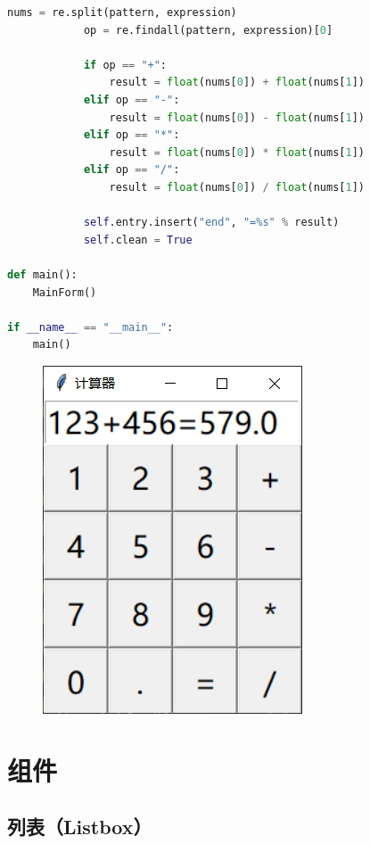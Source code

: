 \begin{lstlisting}[language=Python]
            nums = re.split(pattern, expression)
            op = re.findall(pattern, expression)[0]

            if op == "+":
                result = float(nums[0]) + float(nums[1])
            elif op == "-":
                result = float(nums[0]) - float(nums[1])
            elif op == "*":
                result = float(nums[0]) * float(nums[1])
            elif op == "/":
                result = float(nums[0]) / float(nums[1])
                
            self.entry.insert("end", "=%s" % result)
            self.clean = True

def main():
    MainForm()

if __name__ == "__main__":
    main()
\end{lstlisting}

\begin{tcolorbox}
	\begin{figure}[H]
		\centering
		\includegraphics[]{img/C13/13-3/7.png}
	\end{figure}
\end{tcolorbox}

\newpage

\section{组件}

\subsection{列表（Listbox）}

